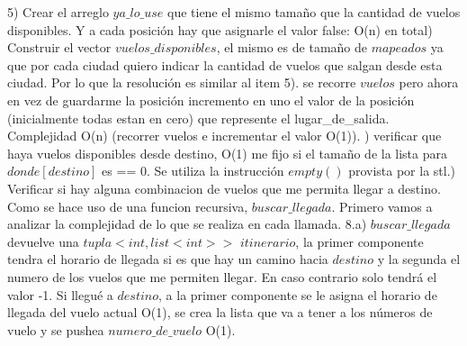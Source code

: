 \documentclass[a4paper]{article}
\begin{document}
5) Crear el arreglo $ya\_lo\_use$ que tiene el mismo tamaño que la cantidad de vuelos disponibles. Y a cada posición hay que asignarle el valor false: O(n) en total) Construir el vector $vuelos\_disponibles$, el mismo es de tamaño de $mapeados$ ya que por cada  ciudad quiero indicar la cantidad de vuelos que salgan desde esta ciudad. Por lo que la resolución es similar al item 5). se recorre $vuelos$ pero ahora en vez de guardarme la posición incremento en uno el valor de la posición (inicialmente todas estan en cero) que represente el lugar\_de\_salida. Complejidad O(n) (recorrer vuelos e incrementar el valor O(1)). ) verificar que haya vuelos disponibles desde destino, O(1) me fijo si el tamaño de la lista para $donde[destino]$ es == 0. Se utiliza la instrucción $empty()$ provista por la stl.) Verificar si hay alguna combinacion de vuelos que me permita llegar a destino. Como se hace uso de una funcion recursiva, $buscar\_llegada$. Primero vamos a analizar la complejidad de lo que se realiza en cada llamada.\newline
8.a) $buscar\_llegada$ devuelve una $tupla<int, list<int>>$ $itinerario$, la primer componente tendra el horario de llegada si es que hay un camino hacia $destino$ y la segunda el numero de los vuelos que me permiten llegar. En caso contrario solo tendrá el valor -1. Si llegué a $destino$, a la primer componente se le asigna el horario de llegada del vuelo actual O(1), se crea la lista que va a tener a los números de vuelo y se pushea $numero\_de\_vuelo$ O(1).\newline
\end{document}
